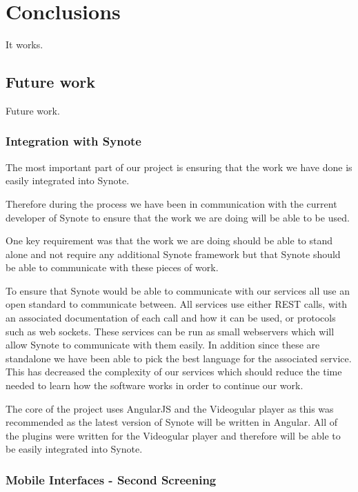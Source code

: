 \chapter{Conclusions} \label{Chapter: Conclusions}
It works.

\section{Future work}

Future work.

\subsection{Integration with Synote}

The most important part of our project is ensuring that the work we have done is easily integrated into Synote.

Therefore during the process we have been in communication with the current developer of Synote to ensure that the work we are doing will be able to be used.

One key requirement was that the work we are doing should be able to stand alone and not require any additional Synote framework but that Synote should be able to communicate with these pieces of work.

To ensure that Synote would be able to communicate with our services all use an open standard to communicate between. All services use either REST calls, with an associated documentation of each call and how it can be used, or protocols such as web sockets. These services can be run as small webservers which will allow Synote to communicate with them easily. In addition since these are standalone we have been able to pick the best language for the associated service. This has decreased the complexity of our services which should reduce the time needed to learn how the software works in order to continue our work.

The core of the project uses AngularJS and the Videogular player as this was recommended as the latest version of Synote will be written in Angular. All of the plugins were written for the Videogular player and therefore will be able to be easily integrated into Synote.

\subsection{Mobile Interfaces - Second Screening}

